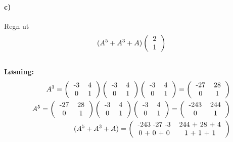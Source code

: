 \documentclass[11pt, A4paper,norsk]{article}
\begin{document}
		\paragraph{c)}
			\begin{flushleft}
Regn ut $$(A^5 + A^3 + A)
\left(\begin{tabular}{ c }
2 \\
1
\end{tabular} \right) $$ \\
\vspace{1mm}
\textbf{Løsning:} \\
\vspace{1mm}
				\begin{align}
A^3 = 
\left(\begin{tabular}{ c c }
-3 & 4 \\ 
0 & 1 
\end{tabular} \right)
\left(\begin{tabular}{ c c }
-3 & 4 \\ 
0 & 1 
\end{tabular} \right)
\left(\begin{tabular}{ c c }
-3 & 4 \\ 
0 & 1 
\end{tabular} \right)
=
\left(\begin{tabular}{ c c }
-27 & 28 \\ 
0 & 1 
\end{tabular} \right) \nonumber \\
A^5 = 
\left(\begin{tabular}{ c c }
-27 & 28 \\ 
0 & 1 
\end{tabular} \right)
\left(\begin{tabular}{ c c }
-3 & 4 \\ 
0 & 1 
\end{tabular} \right)
\left(\begin{tabular}{ c c }
-3 & 4 \\ 
0 & 1 
\end{tabular} \right) 
=
\left(\begin{tabular}{ c c }
-243 & 244 \\ 
0 & 1 
\end{tabular} \right) \nonumber \\
(A^5 + A^3 + A) = 
\left(\begin{tabular}{ c c }
-243 -27 -3 & 244 + 28 + 4 \\ 
0 + 0 + 0 & 1 + 1 + 1 
\end{tabular} \right)

\end{align}
\end{flushleft}
\end{document}
